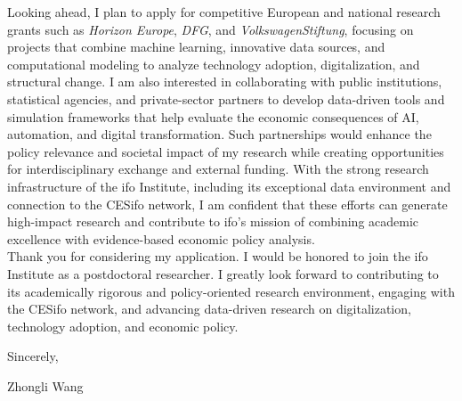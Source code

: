 \documentclass{nfr}
\begin{document}
Looking ahead, I plan to apply for competitive European and national research grants such as \textit{Horizon Europe}, \textit{DFG}, and \textit{VolkswagenStiftung}, focusing on projects that combine machine learning, innovative data sources, and computational modeling to analyze technology adoption, digitalization, and structural change. 
I am also interested in collaborating with public institutions, statistical agencies, and private-sector partners to develop data-driven tools and simulation frameworks that help evaluate the economic consequences of AI, automation, and digital transformation. 
Such partnerships would enhance the policy relevance and societal impact of my research while creating opportunities for interdisciplinary exchange and external funding. 
With the strong research infrastructure of the ifo Institute, including its exceptional data environment and connection to the CESifo network, I am confident that these efforts can generate high-impact research and contribute to ifo’s mission of combining academic excellence with evidence-based economic policy analysis.\\

Thank you for considering my application. 
I would be honored to join the ifo Institute as a postdoctoral researcher. 
I greatly look forward to contributing to its academically rigorous and policy-oriented research environment, engaging with the CESifo network, and advancing data-driven research on digitalization, technology adoption, and economic policy. 
\vspace{3mm}

\noindent Sincerely,\\
\vspace{10mm}

\noindent Zhongli Wang

\vspace{5mm}


\end{document}
